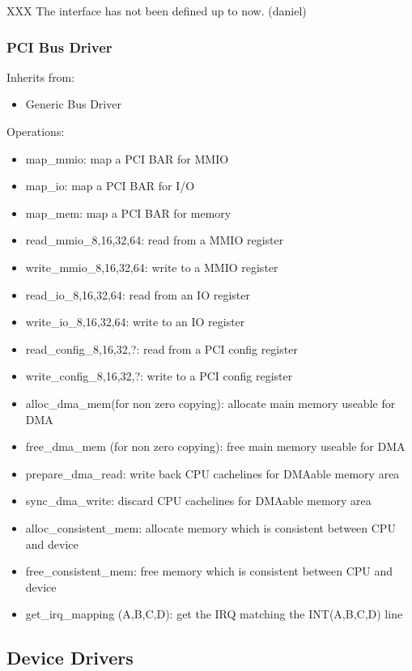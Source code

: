 \documentclass[9pt,a4paper]{extarticle}
\begin{document}
XXX The interface has not been defined up to now. (daniel)


\subsubsection{PCI Bus Driver}

Inherits from:
\begin{itemize}
\item Generic Bus Driver
\end{itemize}

Operations:
\begin{itemize}
\item map\_mmio: map a PCI BAR for MMIO
\item map\_io: map a PCI BAR for I/O
\item map\_mem: map a PCI BAR for memory
\item read\_mmio\_{8,16,32,64}: read from a MMIO register
\item write\_mmio\_{8,16,32,64}: write to a MMIO register
\item read\_io\_{8,16,32,64}: read from an IO register
\item write\_io\_{8,16,32,64}: write to an IO register
\item read\_config\_{8,16,32,?}: read from a PCI config register
\item write\_config\_{8,16,32,?}: write to a PCI config register
\item alloc\_dma\_mem(for non zero copying): allocate main memory useable for DMA
\item free\_dma\_mem  (for non zero copying): free main memory useable for DMA
\item prepare\_dma\_read: write back CPU cachelines for DMAable memory area
\item sync\_dma\_write: discard CPU cachelines for DMAable memory area
\item alloc\_consistent\_mem: allocate memory which is consistent between CPU 
  and device
\item free\_consistent\_mem: free memory which
  is consistent between CPU and device
\item get\_irq\_mapping (A,B,C,D): get the IRQ matching the INT(A,B,C,D) line
\end{itemize}

\subsection{Device Drivers}
\end{document}
